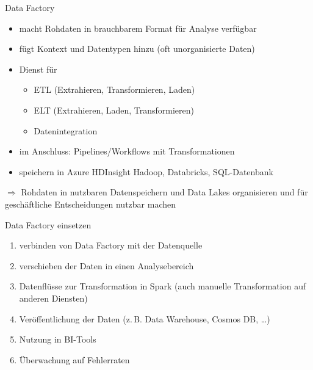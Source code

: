 \begin{flashcard}[Definition]{Data Factory}
  \begin{itemize}
    \item macht Rohdaten in brauchbarem Format für Analyse verfügbar
    \item fügt Kontext und Datentypen hinzu (oft unorganisierte Daten)
    \item Dienst für
      \begin{itemize}
        \item ETL (Extrahieren, Transformieren, Laden)
        \item ELT (Extrahieren, Laden, Transformieren)
        \item Datenintegration
      \end{itemize}
    \item im Anschluss: Pipelines/Workflows mit Transformationen
    \item speichern in Azure HDInsight Hadoop, Databricks, SQL-Datenbank
  \end{itemize}
  $\Rightarrow$ Rohdaten in nutzbaren Datenspeichern und Data Lakes organisieren und für geschäftliche Entscheidungen nutzbar machen
\end{flashcard}

\begin{flashcard}[Definition]{Data Factory einsetzen}
  \begin{enumerate}
    \item verbinden von Data Factory mit der Datenquelle
    \item verschieben der Daten in einen Analysebereich
    \item Datenflüsse zur Transformation in Spark\newline
      (auch manuelle Transformation auf anderen Diensten)
    \item Veröffentlichung der Daten (z.\,B. Data Warehouse, Cosmos DB, \ldots)
    \item Nutzung in BI-Tools
    \item Überwachung auf Fehlerraten
  \end{enumerate}
\end{flashcard}

